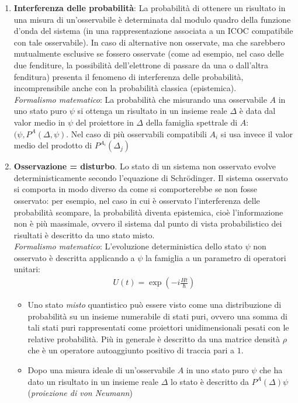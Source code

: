 \documentclass[../../FisicaTeorica.tex]{subfiles}
\begin{document}
\begin{enumerate}
\item \textbf{Interferenza delle probabilità}: La probabilità di ottenere un risultato in una misura di un'osservabile è determinata dal modulo quadro della funzione d'onda del sistema (in una rappresentazione associata a un ICOC compatibile con tale osservabile). In caso di alternative non osservate, ma che sarebbero mutualmente esclusive se fossero osservate (come ad esempio, nel caso delle due fenditure, la possibilità dell'elettrone di passare da una o dall'altra fenditura) presenta il fenomeno di interferenza delle probabilità, incomprensibile anche con la probabilità classica (epistemica).\\
\textit{Formalismo matematico}: La probabilità che misurando una osservabile $A$ in uno stato puro $\psi$ si ottenga un risultato in un insieme reale $\Delta$ è data dal valor medio in $\psi$ del proiettore in $\Delta$ della famiglia spettrale di $A$: $(\psi, P^A(\Delta, \psi)$. Nel caso di più osservabili compatibili $A_i$ si usa invece il valor medio del prodotto di $P^{A_i}(\Delta_j)$
\item \textbf{Osservazione = disturbo}. Lo stato di un sistema non osservato evolve deterministicamente secondo l'equazione di Schr\"odinger. Il sistema osservato si comporta in modo diverso da come si comporterebbe se non fosse osservato: per esempio, nel caso in cui è osservato l'interferenza delle probabilità scompare, la probabilità diventa epistemica, cioè l'informazione non è più massimale, ovvero il sistema dal punto di vista probabilistico dei risultati è descritto da uno stato misto.\\
\textit{Formalismo matematico}: L'evoluzione deterministica dello stato $\psi$ non osservato è descritta applicando a $\psi$ la famiglia a un parametro di operatori unitari:
\begin{align*}
U(t) = \exp\left(-i\frac{Ht}{\hbar}\right)
\end{align*}
\begin{itemize}
\item  Uno stato \textit{misto} quantistico può essere visto come una distribuzione di probabilità su un insieme numerabile di stati puri, ovvero una somma di tali stati puri rappresentati come proiettori unidimensionali pesati con le relative probabilità. Più in generale è descritto da una matrice densità $\rho$ che è un operatore autoaggiunto positivo di traccia pari a $1$.
\item Dopo una misura ideale di un'osservabile $A$ in uno stato puro $\psi$ che ha dato un risultato in un insieme reale $\Delta$ lo stato è descritto da $P^A(\Delta)\psi$ (\textit{proiezione di von Neumann})

\end{itemize}
\end{enumerate}
\end{document}
